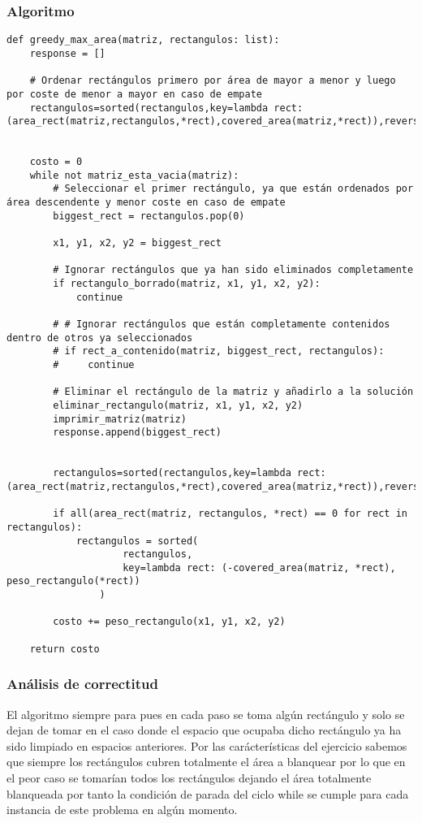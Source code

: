 \documentclass{article}
\begin{document}
	\subsubsection{Algoritmo}
	\begin{lstlisting}
def greedy_max_area(matriz, rectangulos: list):
    response = []
    
    # Ordenar rectángulos primero por área de mayor a menor y luego por coste de menor a mayor en caso de empate
    rectangulos=sorted(rectangulos,key=lambda rect:  (area_rect(matriz,rectangulos,*rect),covered_area(matriz,*rect)),reverse=True)


    costo = 0
    while not matriz_esta_vacia(matriz):
        # Seleccionar el primer rectángulo, ya que están ordenados por área descendente y menor coste en caso de empate
        biggest_rect = rectangulos.pop(0)
        
        x1, y1, x2, y2 = biggest_rect
        
        # Ignorar rectángulos que ya han sido eliminados completamente
        if rectangulo_borrado(matriz, x1, y1, x2, y2):
            continue

        # # Ignorar rectángulos que están completamente contenidos dentro de otros ya seleccionados
        # if rect_a_contenido(matriz, biggest_rect, rectangulos):
        #     continue
        
        # Eliminar el rectángulo de la matriz y añadirlo a la solución
        eliminar_rectangulo(matriz, x1, y1, x2, y2)
        imprimir_matriz(matriz)
        response.append(biggest_rect)


        rectangulos=sorted(rectangulos,key=lambda rect:  (area_rect(matriz,rectangulos,*rect),covered_area(matriz,*rect)),reverse=True)

        if all(area_rect(matriz, rectangulos, *rect) == 0 for rect in rectangulos):
            rectangulos = sorted(
                    rectangulos, 
                    key=lambda rect: (-covered_area(matriz, *rect), peso_rectangulo(*rect))
                )

        costo += peso_rectangulo(x1, y1, x2, y2)
    
    return costo

	\end{lstlisting}

\subsubsection{Análisis de correctitud}
	El algoritmo siempre para pues en cada paso se toma algún rectángulo y solo se dejan de tomar en el caso donde el espacio que ocupaba dicho rectángulo ya ha sido limpiado en espacios anteriores. Por las carácterísticas del ejercicio sabemos que siempre los rectángulos cubren totalmente el área a blanquear por lo que en el peor caso se tomarían todos los rectángulos dejando el área totalmente blanqueada por tanto la condición de parada del ciclo while se cumple para cada instancia de este problema en algún momento.\\
\end{document}
